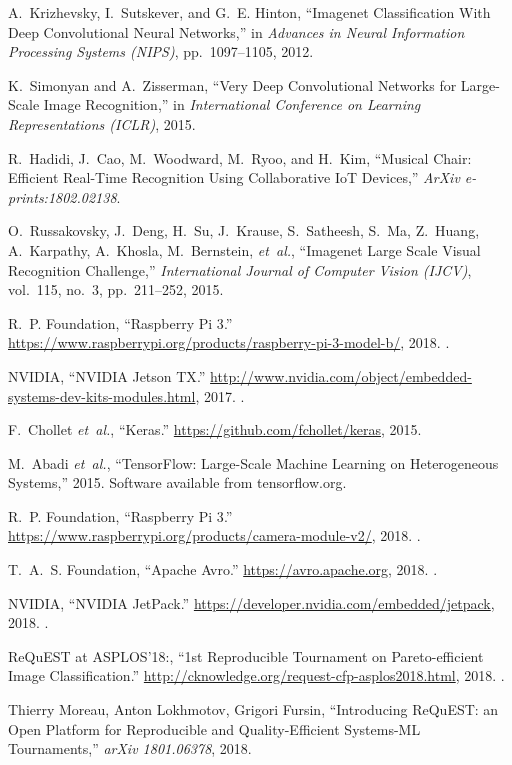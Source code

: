 \documentclass[sigplan]{acmart}
\begin{document}
\begin{thebibliography}{}

A.~Krizhevsky, I.~Sutskever, and G.~E. Hinton, ``{Imagenet Classification With
  Deep Convolutional Neural Networks},'' in {\em Advances in Neural Information
  Processing Systems (NIPS)}, pp.~1097--1105, 2012.
  
K.~Simonyan and A.~Zisserman, ``{Very Deep Convolutional Networks for
  Large-Scale Image Recognition},'' in {\em International Conference on
  Learning Representations (ICLR)}, 2015.
  
R.~{Hadidi}, J.~{Cao}, M.~{Woodward}, M.~{Ryoo}, and H.~{Kim}, ``{Musical
  Chair: Efficient Real-Time Recognition Using Collaborative IoT Devices},''
  {\em ArXiv e-prints:1802.02138}.
  
O.~Russakovsky, J.~Deng, H.~Su, J.~Krause, S.~Satheesh, S.~Ma, Z.~Huang,
  A.~Karpathy, A.~Khosla, M.~Bernstein, {\em et~al.}, ``{Imagenet Large Scale
  Visual Recognition Challenge},'' {\em International Journal of Computer
  Vision (IJCV)}, vol.~115, no.~3, pp.~211--252, 2015.
  
R.~P. Foundation, ``{Raspberry Pi 3}.''
  \url{https://www.raspberrypi.org/products/raspberry-pi-3-model-b/}, 2018.
.

NVIDIA, ``{NVIDIA Jetson TX}.''
  \url{http://www.nvidia.com/object/embedded-systems-dev-kits-modules.html},
  2017.
.

F.~Chollet {\em et~al.}, ``{Keras}.'' \url{https://github.com/fchollet/keras},
  2015.
  
M.~Abadi {\em et~al.}, ``{{TensorFlow}: Large-Scale Machine Learning on
  Heterogeneous Systems},'' 2015.
\newblock Software available from tensorflow.org.

R.~P. Foundation, ``{Raspberry Pi 3}.''
  \url{https://www.raspberrypi.org/products/camera-module-v2/}, 2018.
.

T.~A.~S. Foundation, ``{Apache Avro}.'' \url{https://avro.apache.org}, 2018.
.

NVIDIA, ``{NVIDIA JetPack}.'' \url{https://developer.nvidia.com/embedded/jetpack}, 2018.
.

{ReQuEST at ASPLOS'18:}, ``1st Reproducible Tournament on Pareto-efficient Image Classification.''
    \url{http://cknowledge.org/request-cfp-asplos2018.html},
    2018.
.

 Thierry Moreau, Anton Lokhmotov, Grigori Fursin, ``Introducing ReQuEST: an Open Platform for Reproducible and Quality-Efficient Systems-ML Tournaments,''
  {\em arXiv 1801.06378}, 2018.

\end{thebibliography}
\end{document}
